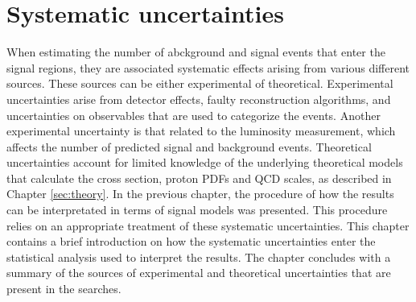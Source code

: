 \chapter{Systematic uncertainties}\label{sec:systs}
\noindent\justify
When estimating the number of abckground and signal events that enter the signal regions, they are associated systematic effects arising from various different sources. 
These sources can be either experimental of theoretical. 
Experimental uncertainties arise from detector effects, faulty reconstruction algorithms, and uncertainties on observables that are used to categorize the events. 
Another experimental uncertainty is that related to the luminosity measurement, which affects the number of predicted signal and background events. 
Theoretical uncertainties account for limited knowledge of the underlying theoretical models that calculate the cross section, proton PDFs and QCD scales, as described in Chapter \ref{sec:theory}. 
\newpara
\noindent\justify
In the previous chapter, the procedure of how the results can be interpretated in terms of signal models was presented. 
This procedure relies on an appropriate treatment of these systematic uncertainties. 
This chapter contains a brief introduction on how the systematic uncertainties enter the statistical analysis used to interpret the results. 
The chapter concludes with a summary of the sources of experimental and theoretical uncertainties that are present in the searches.
\newpage
